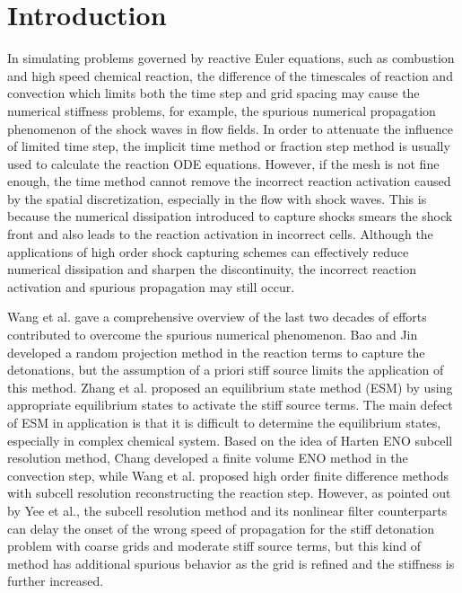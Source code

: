 \documentclass[review]{elsarticle}
\theoremstyle{plain}\newtheorem{definition}{\sc{Definition}}
\theoremstyle{defination}\newtheorem{example}{Example}[section]
\numberwithin{equation}{section}
\numberwithin{table}{section}
\begin{document}
{\section{Introduction}
In simulating problems governed by reactive Euler equations, such as combustion and high speed chemical reaction,
the difference of the timescales of reaction and convection which limits both the time step and grid spacing may cause the numerical stiffness problems, for example, the spurious numerical propagation phenomenon of the shock waves in flow fields\cite{colella1986theoretical,leveque1990study,bao2002random}. In order to attenuate the influence of limited time step, the implicit time method or fraction step method is usually used to calculate the reaction ODE equations. However, if the mesh is not fine enough, the time method cannot remove the incorrect reaction activation caused by the spatial discretization, especially in the flow with shock waves. This is because the numerical dissipation introduced to capture shocks smears the shock front and also leads to the reaction activation in incorrect cells. Although the applications of high order shock capturing schemes can effectively reduce numerical dissipation and sharpen the discontinuity, the incorrect reaction activation and spurious propagation may still occur.

Wang et al.\cite{wang2012high} gave a comprehensive overview of the last two decades of efforts contributed to overcome the spurious numerical phenomenon. Bao and Jin \cite{bao2002random,bao2000random,bao2001random} developed a random projection method in the reaction terms to capture the detonations, but the assumption of a priori stiff source limits  the application of this method. Zhang et al.\cite{zhang2014equilibrium} proposed an equilibrium state method (ESM) by using appropriate equilibrium states to activate the stiff source terms. The main defect of ESM in application is that it is difficult to determine the equilibrium states, especially in complex chemical system. 
Based on the idea of Harten ENO subcell resolution method\cite{harten1989eno}, Chang\cite{chang1989application} developed a finite volume ENO method in the convection step, while Wang et al.\cite{wang2012high, wang2015high} proposed high order finite difference methods with subcell resolution reconstructing the reaction step. However, as pointed out by Yee et al.\cite{yee2013spurious}, the subcell resolution method and its nonlinear filter counterparts\cite{yee2011high} can delay the onset of the wrong speed of propagation for the stiff detonation problem with coarse grids and moderate stiff source terms, but this kind of method has additional spurious behavior as the grid is refined and the stiffness is further increased.

}
\end{document}
